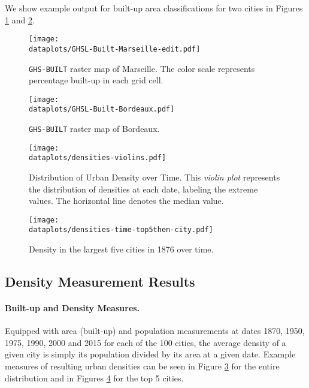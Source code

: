 \documentclass[11pt]{report}
\newcommand{\dataplots}{../../output/data/plots}
\begin{document}
We show example output for built-up area classifications for two cities in Figures \ref{A-fig:built-marseille} and \ref{A-fig:built-bordeaux}. 

\begin{figure}
	\centering
	\texttt{[image: \\dataplots/GHSL-Built-Marseille-edit.pdf]}
	\caption{\texttt{GHS-BUILT} raster map of Marseille. The color scale represents percentage built-up in each grid cell.\label{A-fig:built-marseille}}
\end{figure}


\begin{figure}
	\centering
	\texttt{[image: \\dataplots/GHSL-Built-Bordeaux.pdf]}
	\caption{\texttt{GHS-BUILT} raster map of Bordeaux.\label{A-fig:built-bordeaux}}
\end{figure}


\begin{figure}
	\texttt{[image: \\dataplots/densities-violins.pdf]}
	\caption{Distribution of Urban Density over Time. This \emph{violin plot} represents the distribution of densities at each date, labeling the extreme values. The horizontal line denotes the median value.\label{A-fig:density-dist}}
\end{figure}

\begin{figure}
	\texttt{[image: \\dataplots/densities-time-top5then-city.pdf]}
	\caption{Density in the largest five cities in 1876 over time.\label{A-fig:density-top5}}
\end{figure}



\subsection{Density Measurement Results}\label{A-sec:density-results}


\paragraph{Built-up and Density Measures.} Equipped with area (built-up) and population measurements at dates 1870, 1950, 1975, 1990, 2000 and 2015 for each of the 100 cities, the average density of a given city is simply its population divided by its area at a given date. Example measures of resulting urban densities can be seen in Figure \ref{A-fig:density-dist} for the entire distribution and in Figures \ref{A-fig:density-top5} for the top 5 cities.
\end{document}
